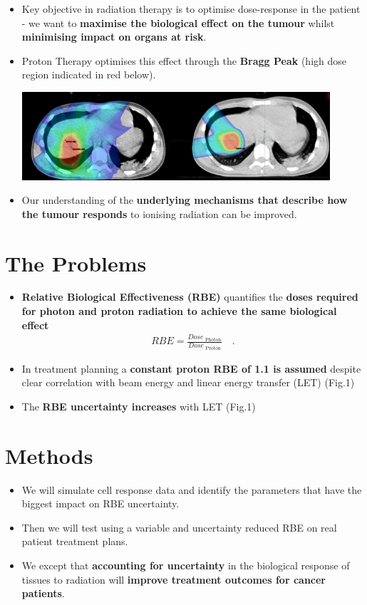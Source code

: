 \documentclass[a3paper,fleqn]{betterposter}
\begin{document}
{\begin{itemize}
\item Key objective in radiation therapy is to optimise dose-response in the patient - we want to \textbf{maximise the biological effect on the tumour} whilst \textbf{minimising impact on organs at risk}.
\item Proton Therapy optimises this effect through the \textbf{Bragg Peak} (high dose region indicated in red below).
\begin{center}
    \includegraphics[width=0.9\textwidth]{patientPBT.png}
\end{center}
\item Our understanding of the \textbf{underlying mechanisms that describe how the tumour responds} to ionising radiation can be improved.
\end{itemize}

\section{The Problems}
\begin{itemize}
    \item \textbf{Relative Biological Effectiveness (RBE)} quantifies the \textbf{doses required for photon and proton radiation to achieve the same biological effect}
    \begin{eqnarray*}
        RBE = \frac{Dose_{\text{ Photon}}}{Dose_{\text{ Proton}}}\quad .
    \end{eqnarray*}
    \item In treatment planning a \textbf{constant proton RBE of 1.1 is assumed} despite clear correlation with beam energy and linear energy transfer (LET) (Fig.1)
    \item The \textbf{RBE uncertainty increases} with LET (Fig.1)
\end{itemize}
\section{Methods}
\begin{itemize}
    \item We will simulate cell response data and identify the parameters that have the biggest impact on RBE uncertainty.
    \item Then we will test using a variable and uncertainty reduced RBE on real patient treatment plans.
    \item We except that \textbf{accounting for uncertainty} in the biological response of tissues to radiation will \textbf{improve treatment outcomes for cancer patients}.
\end{itemize}

}
\end{document}
